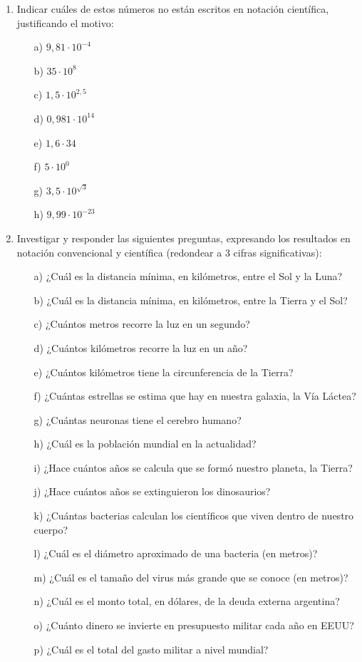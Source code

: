 \documentclass{article}
\begin{document}
\begin{enumerate}
    \item Indicar cuáles de estos números no están escritos en notación científica, justificando el motivo:
    \begin{itemize}
        \item[a)] $9,81 \cdot 10^{-4}$
        \item[b)] $35 \cdot 10^8$
        \item[c)] $1,5 \cdot 10^{2,5}$
        \item[d)] $0,981 \cdot 10^{14}$
        \item[e)] $1,6 \cdot 34$
        \item[f)] $5 \cdot 10^0$
        \item[g)] $3,5 \cdot 10^{\sqrt{3}}$
        \item[h)] $9,99 \cdot 10^{-23}$
    \end{itemize}

    \item Investigar y responder las siguientes preguntas, expresando los resultados en notación convencional y científica (redondear a 3 cifras significativas):
    \begin{itemize}
        \item[a)] ¿Cuál es la distancia mínima, en kilómetros, entre el Sol y la Luna?
        \item[b)] ¿Cuál es la distancia mínima, en kilómetros, entre la Tierra y el Sol?
        \item[c)] ¿Cuántos metros recorre la luz en un segundo?
        \item[d)] ¿Cuántos kilómetros recorre la luz en un año?
        \item[e)] ¿Cuántos kilómetros tiene la circunferencia de la Tierra?
        \item[f)] ¿Cuántas estrellas se estima que hay en nuestra galaxia, la Vía Láctea?
        \item[g)] ¿Cuántas neuronas tiene el cerebro humano?
        \item[h)] ¿Cuál es la población mundial en la actualidad?
        \item[i)] ¿Hace cuántos años se calcula que se formó nuestro planeta, la Tierra?
        \item[j)] ¿Hace cuántos años se extinguieron los dinosaurios?
        \item[k)] ¿Cuántas bacterias calculan los científicos que viven dentro de nuestro cuerpo?
        \item[l)] ¿Cuál es el diámetro aproximado de una bacteria (en metros)?
        \item[m)] ¿Cuál es el tamaño del virus más grande que se conoce (en metros)?
        \item[n)] ¿Cuál es el monto total, en dólares, de la deuda externa argentina?
        \item[o)] ¿Cuánto dinero se invierte en presupuesto militar cada año en EEUU?
        \item[p)] ¿Cuál es el total del gasto militar a nivel mundial?
    \end{itemize}


\end{enumerate}
\end{document}
